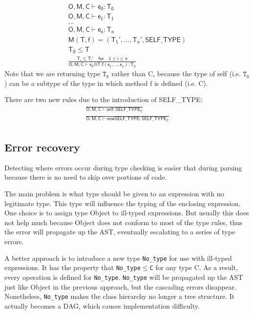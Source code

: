 \begin{gather*}
\mathsf{O,M,C\vdash e_0:T_0}\\
\mathsf{O,M,C\vdash e_1:T_1}\\
\dots\\
\mathsf{O,M,C\vdash e_n:T_n}\\
\mathsf{M(T,f) = (T_1',\dots,T_n',SELF\_TYPE)}\\
\mathsf{T_0\leq T}\\
\mathsf{\frac{T_i\leq T_i'\quad for\quad1\leq i \leq n}{O,M,C\vdash e_0@T.f(e_1,\dots,e_n): T_0}}
\end{gather*}
Note that we are returning type $\mathtt{T_0}$ rather than C, because the type of self (i.e. $\mathtt{T_0}$) can be a subtype of the type in which method f is defined (i.e. C).

There are two new rules due to the introduction of SELF\_TYPE:
\begin{gather*}
\mathsf{\frac{}{O,M,C\vdash self : SELF\_TYPE_C}}\\
\mathsf{\frac{}{O,M,C\vdash new SELF\_TYPE : SELF\_TYPE_C}}\\
\end{gather*}
\subsection{Error recovery}
Detecting where errors occur during type checking is easier that during parsing because there is no need to skip over portions of code. 

The main problem is what type should be given to an expression with no legitimate type. This type will influence the typing of the enclosing expression. One choice is to assign type Object to ill-typed expressions. But usually this does not help much because Object does not conform to most of the type rules, thus the error will propagate up the AST, eventually escalating to a series of type errors.

A better approach is to introduce a new type \texttt{No\_type} for use with ill-typed expressions. It has the property that \texttt{No\_type$\leq$C} for any type C. As a result, every operation is defined for \texttt{No\_type}. \texttt{No\_type} will be propagated up the AST just like Object in the previous approach, but the cascading errors disappear. Nonetheless, \texttt{No\_type} makes the class hierarchy no longer a tree structure. It actually becomes a DAG, which causes implementation difficulty.
\ifx\PREAMBLE\undefined

\fi